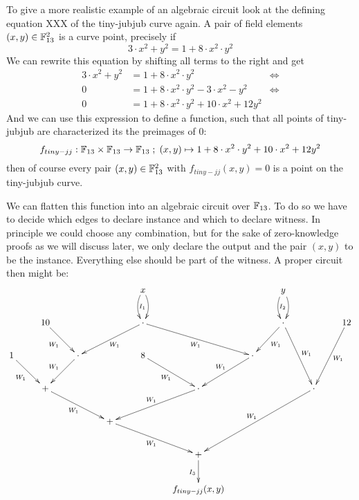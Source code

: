 \begin{example} To give a more realistic example of an algebraic circuit look at the defining equation XXX of the tiny-jubjub curve again. A pair of field elements 
$(x,y)\in \mathbb{F}_{13}^2$ is a curve point, precisely if
$$
3\cdot x^2 + y^2 = 1+ 8\cdot x^2\cdot y^2
$$  
We can rewrite this equation by shifting all terms to the right and get
\begin{align*}
3\cdot x^2 + y^2 & = 1+ 8\cdot x^2\cdot y^2 & \Leftrightarrow\\
0 & = 1+ 8\cdot x^2\cdot y^2 - 3\cdot x^2 - y^2 & \Leftrightarrow\\
0 & = 1+ 8\cdot x^2\cdot y^2 + 10\cdot x^2 +12 y^2
\end{align*}
And we can use this expression to define a function, such that all points of tiny-jubjub are characterized its the preimages of $0$:
$$
f_{tiny-jj}: \mathbb{F}_{13}\times \mathbb{F}_{13}\to \mathbb{F}_{13}\; ; \;
(x,y)\mapsto 1+ 8\cdot x^2\cdot y^2 + 10\cdot x^2 +12 y^2
$$
then of course every pair $(x,y)\in \mathbb{F}_{13}^2$ with $f_{tiny-jj}(x,y)=0$ is a point on the tiny-jubjub curve.

We can flatten this function into an algebraic circuit over $\mathbb{F}_{13}$. To do so we have to decide which edges to declare instance and which to declare witness. In principle we could choose any combination, but for the sake of zero-knowledge proofs as we will discuss later, we only declare the output and the pair $(x,y)$ to be the instance. Everything else should be part of the witness. A proper circuit then might be:
\begingroup
    \fontsize{8pt}{10pt}\selectfont
\[
\xymatrix{
 & &  & &
x\ar_{I_1}@/^/[d]\ar@/_/[d]  &  & & 
y\ar_{I_2}@/^/[d]\ar@/_/[d]\\
 & 10 \ar_{W_1}[dr]& & &
\cdot \ar_{W_1}[drr] \ar^{W_1}[dll]&  & &
\cdot \ar^{W_1}[dl] \ar^{W_1}[ddr] &  &
12 \ar^{W_1}[ddl] \\
1 \ar_{W_1}[dr] & &  
 \cdot \ar_{W_1}[dl] & & 
 8 \ar_{W_1}[dr] & &
 \cdot \ar_{W_1}[dl] & & 
 \\
 & 
 + \ar_{W_1}[drr] & & & &
 \cdot \ar_{W_1}[dll] & & &
 \cdot \ar_{W_1}[ddlll]\\
 & & & 
 + \ar_{W_1}[drr]& & & 
 \\
 & & & & & 
 + \ar_{I_3}[d]\\
 & & & & & 
 f_{tiny-jj}(x,y)
}
\]
\endgroup
\end{example}

